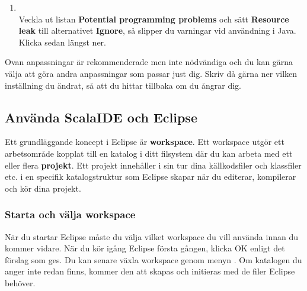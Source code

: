 \begin{enumerate}
\item \EclipsePrefs{}
\\ Veckla ut listan \textbf{Potential programming problems} och sätt \textbf{Resource leak} till alternativet \textbf{Ignore}, så slipper du varningar vid användning  i Java. Klicka sedan  längst ner.

\end{enumerate}

\noindent Ovan anpassningar är rekommenderade men inte nödvändiga och du kan gärna välja att göra andra anpassningar som passar just dig. Skriv då gärna ner vilken inställning du ändrat, så att du hittar tillbaka om du ångrar dig.




\subsection{Använda ScalaIDE och Eclipse}\label{appendix:ide:eclipse:use}

Ett grundläggande koncept i Eclipse är \textbf{workspace}. Ett workspace utgör ett arbetsområde kopplat till en katalog i ditt filsystem där du kan arbeta med ett eller flera \textbf{projekt}. Ett projekt innehåller i sin tur dina källkodsfiler och klassfiler etc. i en specifik katalogstruktur som Eclipse skapar när du editerar, kompilerar och kör dina projekt.

\subsubsection{Starta och välja workspace}\label{subsubsection:start:eclipse}

När du startar Eclipse måste du välja vilket workspace du vill använda innan du kommer vidare. När du kör igång Eclipse första gången, klicka OK enligt det förslag som ges. Du kan senare växla workspace genom menyn . Om katalogen du anger inte redan finns, kommer den att skapas och initieras med de filer Eclipse behöver.

%


